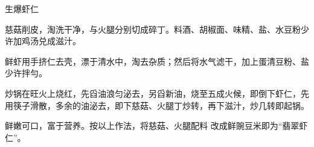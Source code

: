 \begin{recipe}{生爆虾仁}

\ingredients


\cooking

\step 慈菇削皮，淘洗干净，与火腿分别切成碎丁。料酒、胡椒面、味精、盐、水豆粉少许加鸡汤兑成滋汁。

\step 鲜虾用手挤仁去壳，漂于清水中，淘去杂质；然后将水气滤干，加上蛋清豆粉、盐少许拌勻。

\step 炒锅在旺火上烧红，先舀油浪匀泌去，另舀新油，烧至五成火候，即倒下虾仁，先用筷子滑散，多余的油泌去，即下慈菇、火腿丁炒转，再下滋汁，炒几转即起锅。

\notes

鲜嫩可口，富于营养。按以上作法，将慈菇、火腿配料 改成鲜豌豆米即为“翡翠虾仁”。

\end{recipe}

